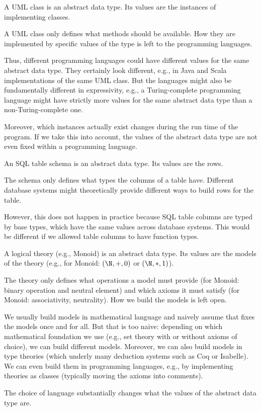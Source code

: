 \begin{example}[Classes]
A UML class is an abstract data type.
Its values are the instances of implementing classes.

A UML class only defines what methods should be available.
How they are implemented by specific values of the type is left to the programming languages.

Thus, different programming languages could have different values for the same abstract data type.
They certainly look different, e.g., in Java and Scala implementations of the same UML class.
But the languages might also be fundamentally different in expressivity, e.g., a Turing-complete programming language might have strictly more values for the same abstract data type than a non-Turing-complete one.

Moreover, which instances actually exist changes during the run time of the program.
If we take this into account, the values of the abstract data type are not even fixed within a programming language.
\end{example}

\begin{example}[Schemas]
An SQL table schema is an abstract data type.
Its values are the rows.

The schema only defines what types the columns of a table have.
Different database systems might theoretically provide different ways to build rows for the table.

However, this does not happen in practice because SQL table columns are typed by base types, which have the same values across database systems.
This would be different if we allowed table columns to have function types.
\end{example}

\begin{example}[Theories]
A logical theory (e.g., Monoid) is an abstract data type.
Its values are the models of the theory (e.g., for Monoid: $(\N,+,0)$ or $(\N,*,1)$).

The theory only defines what operations a model must provide (for Monoid: binary operation and neutral element) and which axioms it must satisfy (for Monoid: associativity, neutrality).
How we build the models is left open.

We usually build models in mathematical language and naively assume that fixes the models once and for all.
But that is too naive: depending on which mathematical foundation we use (e.g., set theory with or without axioms of choice), we can build different models.
Moreover, we can also build models in type theories (which underly many deduction systems such as Coq or Isabelle).
We can even build them in programming languages, e.g., by implementing theories as classes (typically moving the axioms into comments).

The choice of language substantially changes what the values of the abstract data type are.
\end{example}


